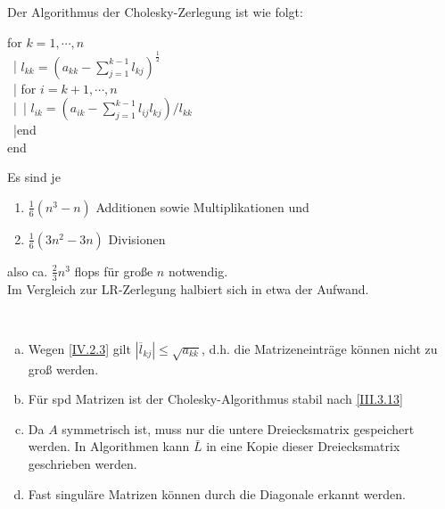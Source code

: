 Der Algorithmus der Cholesky-Zerlegung ist wie folgt:

\begin{pseudocode}{0.55\linewidth}
  for  $k=1, \cdots , n$\\
  ~|\> $l_{kk} = (a_{kk}-\sum_{j=1}^{k-1}l_{kj})^{\frac{1}{2}}$ \\
  ~|\> for $i= k+1, \cdots , n$ \\
  ~|\>~|\> $l_{ik} = ( a_{ik}- \sum_{j=1}^{k-1}l_{ij} l_{kj})/{l_{kk}}$  \\
  ~|\>end\\
  end
\end{pseudocode}



Es sind je 
\begin{enumerate}
\item[] $\frac{1}{6}(n^3-n) $ Additionen sowie Multiplikationen und 
\item[]  $\frac{1}{6}(3n^2-3n) $ Divisionen 
\end{enumerate}
also ca. $\frac{2}{3} n^3$ flops für große $n$ notwendig. \\
Im Vergleich zur LR-Zerlegung halbiert sich in etwa der Aufwand.

\begin{Beme}~
  \begin{enumerate}[a)]
  \item Wegen \eqref{IV.2.3} gilt $|\overline{l}_{kj}| \leq \sqrt{a_{kk}}$,
    d.h. die Matrizeneinträge können nicht zu groß werden.
  \item Für spd Matrizen ist der Cholesky-Algorithmus stabil nach \eqref{III.3.13}
  \item Da $A$ symmetrisch ist, muss nur die untere Dreiecksmatrix gespeichert werden.
    In Algorithmen kann $\bar{L}$ in eine Kopie dieser Dreiecksmatrix geschrieben werden.
  \item Fast singuläre Matrizen können durch die Diagonale erkannt werden.
  \end{enumerate}
\end{Beme}


 


